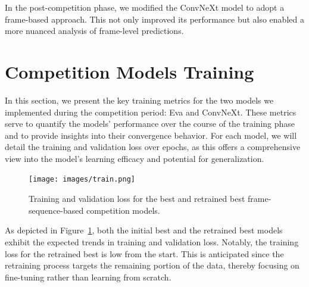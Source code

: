 \documentclass[a4paper,12pt,openright]{book}
\begin{document}
In the post-competition phase, we modified the ConvNeXt model to adopt a frame-based approach. This not only improved its performance but also enabled a more nuanced analysis of frame-level predictions.


\section{Competition Models Training}
In this section, we present the key training metrics for the two models we implemented during the competition period: Eva and ConvNeXt. These metrics serve to quantify the models' performance over the course of the training phase and to provide insights into their convergence behavior. For each model, we will detail the training and validation loss over epochs, as this offers a comprehensive view into the model's learning efficacy and potential for generalization.

\begin{figure}[!htb]
\centering
\texttt{[image: images/train.png]}
\caption{Training and validation loss for the best and retrained best frame-sequence-based competition models.}
\label{fig:training_validation_loss}
\end{figure}

As depicted in Figure~\ref{fig:training_validation_loss}, both the initial best and the retrained best models exhibit the expected trends in training and validation loss. Notably, the training loss for the retrained best is low from the start. This is anticipated since the retraining process targets the remaining portion of the data, thereby focusing on fine-tuning rather than learning from scratch.
\end{document}
